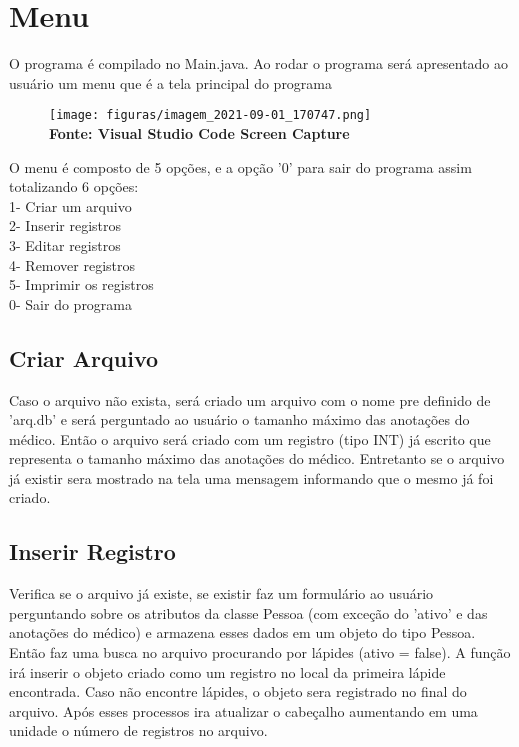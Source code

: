 \section{\esp Menu}
O programa é compilado no Main.java. Ao rodar o programa será apresentado ao usuário um menu que é a tela principal do programa
\\
\begin{figure}[ht]
	\centering	
	
	\vspace{-0.4cm}
	\texttt{[image: figuras/imagem\_2021-09-01\_170747.png]}
	 \vspace{-0.2cm}
	\\\textbf{\footnotesize Fonte: Visual Studio Code Screen Capture}
	\label{fig:figura1}
\end{figure}
\vspace{-0.5cm}

O menu é composto de 5 opções, e a opção '0' para sair do programa assim totalizando 6 opções:\\
             1- Criar um arquivo\\
             2- Inserir registros\\
             3- Editar registros\\
             4- Remover registros\\
             5- Imprimir os registros\\
             0- Sair do programa

\subsection{\esp Criar Arquivo}

Caso o arquivo não exista, será criado um arquivo com o nome pre definido de 'arq.db' e será perguntado ao usuário o tamanho máximo das anotações do médico. Então o arquivo será criado com um registro (tipo INT) já escrito que representa o tamanho máximo das anotações do médico. Entretanto se o arquivo já existir sera mostrado na tela uma mensagem informando que o mesmo já foi criado.

\subsection{\esp Inserir Registro}

Verifica se o arquivo já existe, se existir faz um formulário ao usuário perguntando sobre os atributos da classe Pessoa (com exceção do 'ativo' e das anotações do médico) e armazena esses dados em um objeto do tipo Pessoa. Então faz uma busca no arquivo procurando por lápides (ativo = false). A função irá inserir o objeto criado como um registro no local da primeira lápide encontrada. Caso não encontre lápides, o objeto sera registrado no final do arquivo. Após esses processos ira atualizar o cabeçalho aumentando em uma unidade o número de registros no arquivo.

